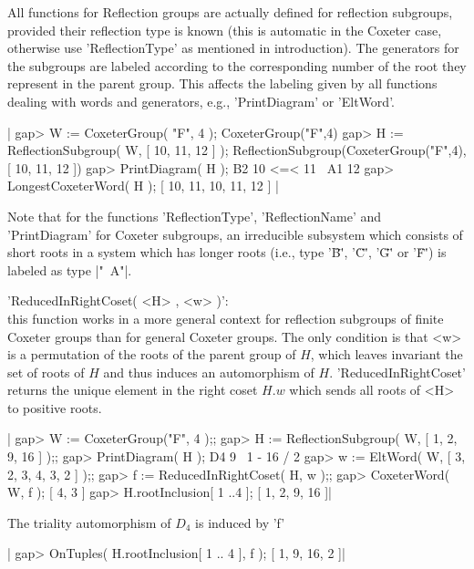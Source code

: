
All functions for Reflection groups  are actually defined for reflection
subgroups, provided their reflection type is known (this is automatic in
the  Coxeter  case,  otherwise  use  'ReflectionType'  as  mentioned  in
introduction). The generators for the subgroups are labeled according to
the corresponding number of the root they represent in the parent group.
This affects the labeling given by  all functions dealing with words and
generators, e.g., 'PrintDiagram' or 'EltWord'.

|    gap> W := CoxeterGroup( "F", 4 );
    CoxeterGroup("F",4)
    gap> H := ReflectionSubgroup( W, [ 10, 11, 12 ] );
    ReflectionSubgroup(CoxeterGroup("F",4), [ 10, 11, 12 ])
    gap> PrintDiagram( H );
    B2     10 <=< 11
    ~A1    12
    gap> LongestCoxeterWord( H );
    [ 10, 11, 10, 11, 12 ] |

Note  that  for  the functions  'ReflectionType',  'ReflectionName'  and
'PrintDiagram'  for Coxeter  subgroups, an  irreducible subsystem  which
consists of short  roots in a system which has  longer roots (i.e., type
'\"B\"', '\"C\"', '\"G\"' or '\"F\"') is labeled as type |"~A"|.

'ReducedInRightCoset(  <H> ,  <w> )':\\  this function  works in  a more
general context for  reflection subgroups of finite  Coxeter groups than
for  general  Coxeter groups.  The  only  condition  is  that <w>  is  a
permutation  of the  roots  of the  parent group  of  $H$, which  leaves
invariant the  set of roots of  $H$ and thus induces  an automorphism of
$H$. 'ReducedInRightCoset' returns the unique element in the right coset
$H.w$ which sends all roots of <H> to positive roots.

|    gap> W := CoxeterGroup("F", 4 );;
    gap> H := ReflectionSubgroup( W, [ 1, 2, 9, 16 ] );;
    gap> PrintDiagram( H );
    D4   9
          \
           1 - 16
          /
         2
    gap> w := EltWord( W, [ 3, 2, 3, 4, 3, 2 ] );;
    gap> f := ReducedInRightCoset( H, w );;
    gap> CoxeterWord( W, f );
    [ 4, 3 ]
    gap> H.rootInclusion{[ 1 ..4 ]};
    [ 1, 2, 9, 16 ]|

The triality automorphism of $D_4$ is induced by 'f'\:

|    gap> OnTuples( H.rootInclusion{[ 1 .. 4 ]}, f );
    [ 1, 9, 16, 2 ]|

\Section{ReducedRightCosetRepresentatives}

